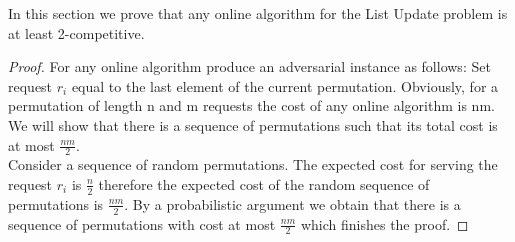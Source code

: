 In this section we prove that any online algorithm for the List Update problem is at least 2-competitive.

\begin{proof}
    For any online algorithm produce an adversarial instance as follows: Set request $r_i$ equal to the last element of the current permutation. Obviously, for a permutation of length n and m requests the cost of any online algorithm is nm. We will show that there is a sequence of permutations such that its total cost is at most $\frac{nm}{2}$. \\
    
    Consider a sequence of random permutations. The expected cost for serving the request $r_i$ is $\frac{n}{2}$ therefore the expected cost of the random sequence of permutations is $\frac{nm}{2}$. By a probabilistic argument we obtain that there is a sequence of permutations with cost at most $\frac{nm}{2}$ which finishes the proof.
\end{proof}
